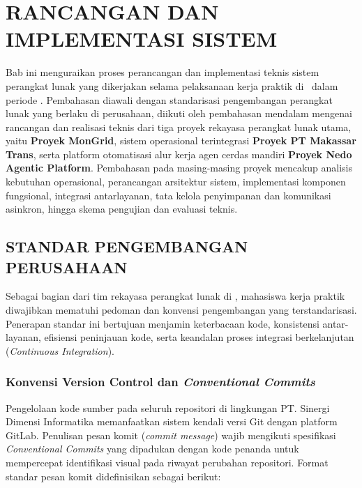 \chapter{RANCANGAN DAN IMPLEMENTASI SISTEM}

Bab ini menguraikan proses perancangan dan implementasi teknis sistem perangkat lunak yang dikerjakan selama pelaksanaan kerja praktik di \NamaPerusahaan\ dalam periode \PeriodeKP. Pembahasan diawali dengan standarisasi pengembangan perangkat lunak yang berlaku di perusahaan, diikuti oleh pembahasan mendalam mengenai rancangan dan realisasi teknis dari tiga proyek rekayasa perangkat lunak utama, yaitu \textbf{Proyek MonGrid}, sistem operasional terintegrasi \textbf{Proyek PT Makassar Trans}, serta platform otomatisasi alur kerja agen cerdas mandiri \textbf{Proyek Nedo Agentic Platform}. Pembahasan pada masing-masing proyek mencakup analisis kebutuhan operasional, perancangan arsitektur sistem, implementasi komponen fungsional, integrasi antarlayanan, tata kelola penyimpanan dan komunikasi asinkron, hingga skema pengujian dan evaluasi teknis.

\section{STANDAR PENGEMBANGAN PERUSAHAAN}

Sebagai bagian dari tim rekayasa perangkat lunak di \NamaPerusahaan, mahasiswa kerja praktik diwajibkan mematuhi pedoman dan konvensi pengembangan yang terstandarisasi. Penerapan standar ini bertujuan menjamin keterbacaan kode, konsistensi antar-layanan, efisiensi peninjauan kode, serta keandalan proses integrasi berkelanjutan (\textit{Continuous Integration}).

\subsection{Konvensi Version Control dan \textit{Conventional Commits}}

Pengelolaan kode sumber pada seluruh repositori di lingkungan PT. Sinergi Dimensi Informatika memanfaatkan sistem kendali versi Git dengan platform GitLab. Penulisan pesan komit (\textit{commit message}) wajib mengikuti spesifikasi \textit{Conventional Commits} yang dipadukan dengan kode penanda untuk mempercepat identifikasi visual pada riwayat perubahan repositori. Format standar pesan komit didefinisikan sebagai berikut:

